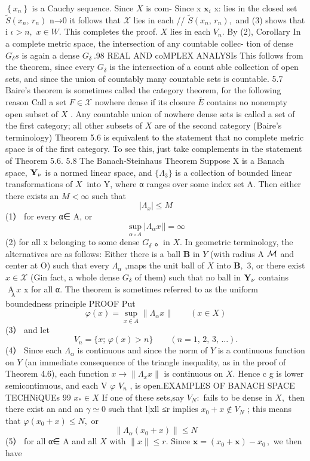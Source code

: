 $\left\{x_{n}\right\}$ is a Cauchy sequence. Since $X$ is com- Since x ${\boldsymbol{x}}_{i}$ x: lies in the closed set ${\tilde{S}}(x_{n},\,r_{n})$ n→0 it follows that $\scriptstyle{\mathcal{X}}$ lies in each // ${\tilde{S}}(x_{n},\,r_{n}),$ and (3) shows that i $\iota>n,$ $x\in W.$ This completes the proof. $\scriptstyle{X}$ lies in each $V_{n}.$ By (2), Corollary In a complete metric space, the intersection of any countable collec- tion of dense $G_{\delta}^{\cdot}s$ is again a dense $G_{\delta}\ .$98 REAL AND coMPLEX ANALYSIs This follows from the theorem, since every $G_{\delta}$ is the intersection of a count able collection of open sets, and since the union of countably many countable sets is countable. 5.7 Baire's theorem is sometimes called the category theorem, for the following reason Call a set $\scriptstyle{F\in{\mathcal{X}}}$ nowhere dense if its closure $\overline{{E}}$ contains no nonempty open subset of $X$ . Any countable union of nowhere dense sets is called a set of the first category; all other subsets of $X$ are of the second category (Baire's terminology) Theorem 5.6 is equivalent to the statement that no complete metric space is of the first category. To see this, just take complements in the statement of Theorem 5.6. 5.8 The Banach-Steinhaus Theorem Suppose X is a Banach space, ${\bf Y_{\nu}}$ is a normed linear space, and $\scriptstyle\{\Lambda_{3}\}$ is a collection of bounded linear transformations of $\textstyle X{\mathrm{~}}$ into Y, where α ranges over some index set A. Then either there exists an $M<\infty$ such that $$ |\Lambda_{x}|\leq M $$ (1） for every α∈ A, or $$ \operatorname*{sup}_{\alpha\circ A}|\Lambda_{\alpha}x||=\infty $$ (2) for all x belonging to some dense $G_{\delta}$ 。in $X.$ In geometric terminology, the alternatives are as follows: Either there is a ball $\boldsymbol{B}$ in ${\mathbf{}}Y$ (with radius A ${\cal{M}}$ and center at O) such that every $\Lambda_{\alpha}$ ,maps the unit ball of $X$ into ${\boldsymbol{B}},$ 3, or there exist $x\in{\mathcal{X}}$ (Gin fact, a whole dense $G_{\delta}$ of them) such that no ball in ${\bf Y_{\nu}}$ contains ${\underset{\mathrm{A}}{\operatorname{A}x}}$ x for all α. The theorem is sometimes referred to as the uniform boundedness principle PROOF Put $$ \varphi(x)=\operatorname*{sup}_{x\in A}\|\Lambda_{\alpha}x\|\qquad(x\in X) $$ (3） and let $$ V_{n}=\{x;\,\varphi(x)>n\}\qquad(n=1,\,2,\,3,\,\ldots). $$ (4） Since each $\Lambda_{\alpha}$ is continuous and since the norm of ${\mathbf{}}Y$ is a continuous function on ${\mathbf{}}Y$ (an immediate consequence of the triangle inequality, as in the proof of Theorem 4.6), each function $x\to\|\Lambda_{x}x\|$ is continuous on $X.$ Hence c g is lower semicontinuous, and each V $\varphi$ ${\mathit{V}}_{n}$ , is open.EXAMPLES OF BANACH SPACE TECHNiQUEs 99 $x_{*}\in X$ If one of these sets,say $V_{N}{\mathrm{:}}$ fails to be dense in $X,$ then there exist an and an $\scriptstyle\gamma\simeq0$ such that l|xll ≤r implies $x_{0}+x\notin V_{N}$ ; this means that $\varphi(x_{0}+x)\leq N,$ or $$ \|\Lambda_{\alpha}(x_{0}+x)\|\leq N $$ (5） for all α∈ A and all $\scriptstyle{X}$ with $\|x\|\leq r.$ Since ${\boldsymbol{x}}=(x_{0}+{\boldsymbol{x}})-x_{0}\,,$ we then have $$ 